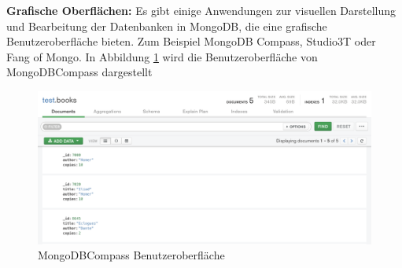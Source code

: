 \noindent
{}
\textbf{Grafische Oberflächen:}
Es gibt einige Anwendungen zur visuellen Darstellung und Bearbeitung der Datenbanken in MongoDB, die eine grafische Benutzeroberfläche bieten. Zum Beispiel MongoDB Compass, Studio3T oder Fang of Mongo. In Abbildung \ref{MongoDBCompass} wird die Benutzeroberfläche von MongoDBCompass dargestellt


\begin{figure}[tbt]
\centering
\includegraphics[width=15cm]{images/mongodb_compass.png}
\caption{MongoDBCompass Benutzeroberfläche}
\label{MongoDBCompass}
\end{figure}